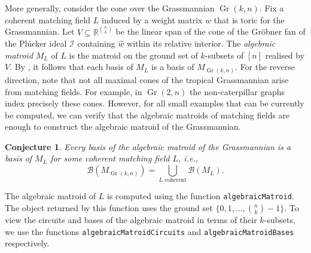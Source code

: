 \documentclass[11pt]{article}
\newcommand{\RR}{\mathbb R}
\newcommand{\MB}{\mathcal B}
\newcommand{\MI}{\mathcal I}
\DeclareMathOperator{\Gr}{Gr}
\theoremstyle{plain}
\newtheorem{conjecture}[theorem]{Conjecture}
\theoremstyle{definition}
\theoremstyle{remark}
\begin{document}
More generally, consider the cone over the Grassmannian $\Gr(k,n)$. Fix a coherent matching field $L$ induced by a weight matrix $w$ that is toric for the Grassmannian. Let $V \subseteq \RR^{\binom nk}$ be the linear span of the cone of the Gr\"obner fan of the Pl\"ucker ideal $\MI$ containing $\widehat w$ within its relative interior. The \textit{algebraic matroid} $M_L$ of $L$ is the matroid on the ground set of $k$-subsets of $[n]$ realised by $V$. By \cite[Lemma~2]{yu2017algebraic}, it follows that each basis of $M_L$ is a basis of $M_{\Gr(k,n)}$. For the reverse direction, note that not all maximal cones of the tropical Grassmannian arise from matching fields. For example, in $\Gr(2,n)$ the non-caterpillar graphs index precisely these cones. However, for all small examples that can be currently be computed, we can verify that the algebraic matroids of matching fields are enough to construct the algebraic matroid of the Grassmannian.

\begin{conjecture}\label{conj: matching fields algebraic matroids}
    Every basis of the algebraic matroid of the Grassmannian is a basis of $M_L$ for some coherent matching field $L$, i.e.,
    \[
    \MB(M_{\Gr(k,n)}) = \bigcup_{L \text{ coherent}} \MB(M_L).
    \]
\end{conjecture}

The algebraic matroid of $L$ is computed using the function \texttt{algebraicMatroid}. The object returned by this function uses the ground set $\{0,1,\dots, \binom nk-1\}$. To view the circuits and bases of the algebraic matroid in terms of their $k$-subsets, we use the functions \texttt{algebraicMatroidCircuits} and \texttt{algebraicMatroidBases} respectively.
\end{document}
